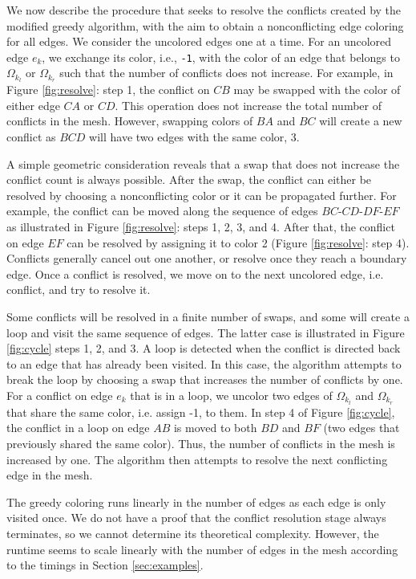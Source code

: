 \documentclass[12pt]{article}
\begin{document}
We now describe the procedure that seeks to resolve the conflicts created by the modified greedy algorithm, with the aim to obtain a nonconflicting edge coloring for all edges.  
We consider the uncolored edges one at a time.  
For an uncolored edge $e_k$, we exchange its color, i.e., \texttt{-1}, with the color of an edge that belongs to $\Omega_{k_l}$ or $\Omega_{k_r}$ such that the number of conflicts does not increase.  For example, in Figure \ref{fig:resolve}: step 1, the conflict on $CB$ may be swapped with the color of either edge $CA$ or $CD$.  
This operation does not increase the total number of conflicts in the mesh.  However, swapping colors of $BA$ and $BC$ will create a new conflict as $BCD$ will have two edges with the same color, 3.  
 
A simple geometric consideration reveals that a swap that does not increase the conflict count is always possible.  
After the swap, the conflict can either be resolved by choosing a nonconflicting color or it can be propagated further.  
For example, the conflict can be moved along the sequence of edges $BC$-$CD$-$DF$-$EF$ as illustrated in Figure \ref{fig:resolve}: steps 1, 2, 3, and 4.  
After that, the conflict on edge $EF$ can be resolved by assigning it to color 2 (Figure \ref{fig:resolve}: step 4).  Conflicts generally cancel out one another, or resolve once they reach a boundary edge.
Once a conflict is resolved, we move on to the next uncolored edge, i.e. conflict, and try to resolve it.  

Some conflicts will be resolved in a finite number of swaps, and some will create a loop and visit the same sequence of edges.  
The latter case is illustrated in Figure \ref{fig:cycle} steps 1, 2, and 3.  
A loop is detected when the conflict is directed back to an edge that has already been visited.  
In this case, the algorithm attempts to break the loop by choosing a swap that increases the number of conflicts by one.  For a conflict on edge $e_k$ that is in a loop, we uncolor two edges of $\Omega_{k_l}$ and $\Omega_{k_r}$ that share the same color, i.e. assign -1, to them.  
In step 4 of Figure \ref{fig:cycle}, the conflict in a loop on edge $AB$ is moved to both $BD$ and $BF$ (two edges that previously shared the same color).  
Thus, the number of conflicts in the mesh is increased by one.  
The algorithm then attempts to resolve the next conflicting edge in the mesh.




The greedy coloring runs linearly in the number of edges as each edge is only visited once.  We do not have a proof that the conflict resolution stage always terminates, so we cannot determine its theoretical complexity.  However, the runtime seems to scale linearly with the number of edges in the mesh according to the timings in Section \ref{sec:examples}. 
\end{document}
